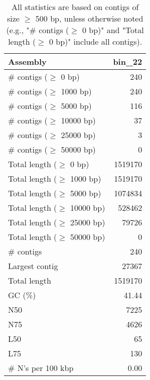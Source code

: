 \documentclass[12pt,a4paper]{article}
\begin{document}
\begin{table}[ht]
\begin{center}
\caption{All statistics are based on contigs of size $\geq$ 500 bp, unless otherwise noted (e.g., "\# contigs ($\geq$ 0 bp)" and "Total length ($\geq$ 0 bp)" include all contigs).}
\begin{tabular}{|l*{1}{|r}|}
\hline
Assembly & bin\_22 \\ \hline
\# contigs ($\geq$ 0 bp) & 240 \\ \hline
\# contigs ($\geq$ 1000 bp) & 240 \\ \hline
\# contigs ($\geq$ 5000 bp) & 116 \\ \hline
\# contigs ($\geq$ 10000 bp) & 37 \\ \hline
\# contigs ($\geq$ 25000 bp) & 3 \\ \hline
\# contigs ($\geq$ 50000 bp) & 0 \\ \hline
Total length ($\geq$ 0 bp) & 1519170 \\ \hline
Total length ($\geq$ 1000 bp) & 1519170 \\ \hline
Total length ($\geq$ 5000 bp) & 1074834 \\ \hline
Total length ($\geq$ 10000 bp) & 528462 \\ \hline
Total length ($\geq$ 25000 bp) & 79726 \\ \hline
Total length ($\geq$ 50000 bp) & 0 \\ \hline
\# contigs & 240 \\ \hline
Largest contig & 27367 \\ \hline
Total length & 1519170 \\ \hline
GC (\%) & 41.44 \\ \hline
N50 & 7225 \\ \hline
N75 & 4626 \\ \hline
L50 & 65 \\ \hline
L75 & 130 \\ \hline
\# N's per 100 kbp & 0.00 \\ \hline
\end{tabular}
\end{center}
\end{table}
\end{document}
